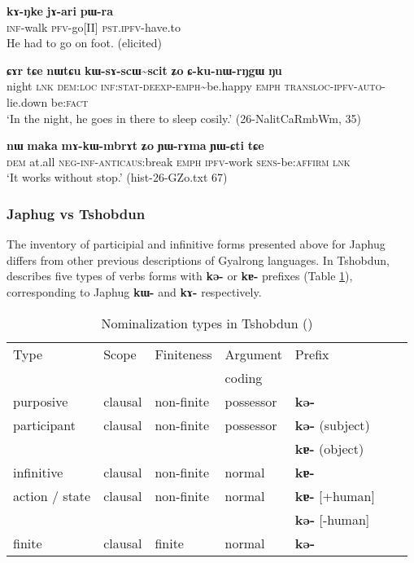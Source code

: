 \documentclass[oneside,a4paper,11pt]{article}
\newcommand{\ipa}[1]{\textbf{\phon#1}} %
\newcommand{\tld}{\textasciitilde{}}
\begin{document}
\begin{exe}
\ex \label{ex:kANke.jari}
\gll
\ipa{kɤ-ŋke} 	\ipa{jɤ-ari} 	\ipa{pɯ-ra} \\
\textsc{inf}-walk \textsc{pfv}-go[II] \textsc{pst.ipfv}-have.to \\
\glt He had to go on foot. (elicited)
\end{exe}

\begin{exe}
\ex \label{ex:kWsAscWscit}
\gll
\ipa{ɕɤr} 	\ipa{tɕe} 	\ipa{nɯtɕu} 	\ipa{kɯ-sɤ-scɯ\tld{}scit} 	\ipa{ʑo} 	\ipa{ɕ-ku-nɯ-rŋgɯ} 	\ipa{ŋu} \\
night \textsc{lnk} \textsc{dem:loc} \textsc{inf:stat-deexp-emph}\tld{}be.happy \textsc{emph} \textsc{transloc-ipfv-auto}-lie.down be:\textsc{fact} \\
\glt `In the night, he goes in there to sleep cosily.' (26-NalitCaRmbWm, 35)
\end{exe}

\begin{exe}
\ex \label{ex:mAkWmbrAt}
\gll
 \ipa{nɯ} 	\ipa{maka} 	\ipa{mɤ-kɯ-mbrɤt} 	\ipa{ʑo} 	\ipa{ɲɯ-rɤma} 	\ipa{ɲɯ-ɕti} 	\ipa{tɕe} \\
 \textsc{dem} at.all \textsc{neg-inf-anticaus:}break \textsc{emph} \textsc{ipfv}-work \textsc{sens}-be:\textsc{affirm} \textsc{lnk} \\
\glt `It works without stop.' (hist-26-GZo.txt 67)
\end{exe}
 
\subsubsection{Japhug vs Tshobdun} \label{sec:tshobdun.k}
The inventory of participial and infinitive forms presented above for Japhug differs from other previous descriptions of Gyalrong languages. In Tshobdun, \citet[476]{sun12complementation} describes five types of verbs forms with \ipa{kə-} or \ipa{kɐ-} prefixes (Table \ref{tab:tshobdun.nmlz}), corresponding to Japhug \ipa{kɯ-} and \ipa{kɤ-} respectively.

\begin{table}[H]
\caption{Nominalization types in Tshobdun (\citealt[476]{sun12complementation}) } \label{tab:tshobdun.nmlz} \centering
\begin{tabular}{lllllll}
\toprule
Type & Scope & Finiteness & Argument & Prefix \\
&&&coding \\
\midrule
purposive & clausal & non-finite& possessor & \ipa{kə-} \\
participant & clausal & non-finite& possessor & \ipa{kə-} (subject) \\
&&&& \ipa{kɐ-} (object)\\
infinitive & clausal & non-finite& normal &  \ipa{kɐ-}  \\
action / state & clausal & non-finite& normal &  \ipa{kɐ-} [+human] \\
&&&&\ipa{kə-}  [-human] \\
finite  & clausal & finite& normal &  \ipa{kə-} \\
\bottomrule
\end{tabular}
\end{table}
\end{document}

